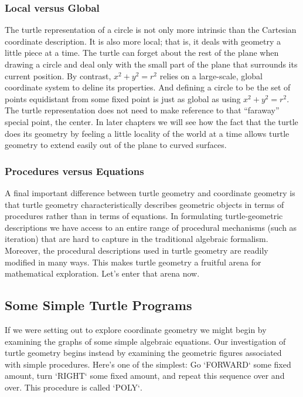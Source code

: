 \documentclass{book}
\begin{document}
\subsubsection{Local versus Global}

The turtle representation of a circle is not only more intrinsic than the
Cartesian coordinate description. It is also more local; that is, it deals
with geometry a little piece at a time. The turtle can forget about the
rest of the plane when drawing a circle and deal only with the small part
of the plane that surrounds its current position. By contrast, $ x^2 + y^2 = r^2 $ relies on a large-scale, global coordinate system to deline its properties.
And defining a circle to be the set of points equidistant from some fixed
point is just as global as using $ x^2 + y^2 = r^2$. The turtle representation
does not need to make reference to that ``faraway'' special point, the
center. In later chapters we will see how the fact that the turtle does its
geometry by feeling a little locality of the world at a time allows turtle
geometry to extend easily out of the plane to curved surfaces.

\subsubsection{Procedures versus Equations} 

A final important difference between turtle geometry and coordinate
geometry is that turtle geometry characteristically describes geometric
objects in terms of procedures rather than in terms of equations. In 
formulating turtle-geometric descriptions we have access to an entire range
of procedural mechanisms (such as iteration) that are hard to capture in
the traditional algebraic formalism. Moreover, the procedural descriptions 
used in turtle geometry are readily modified in many ways. This
makes turtle geometry a fruitful arena for mathematical exploration.
Let's enter that arena now.

\subsection{Some Simple Turtle Programs}

If we were setting out to explore coordinate geometry we might begin
by examining the graphs of some simple algebraic equations. Our investigation of turtle geometry begins instead by examining the geometric
figures associated with simple procedures. Here's one of the simplest:
Go \textsc{`FORWARD`} some fixed amount, turn \textsc{`RIGHT`} some fixed amount, 
and repeat this sequence over and over. This procedure is called \textsc{`POLY`}.
\end{document}
